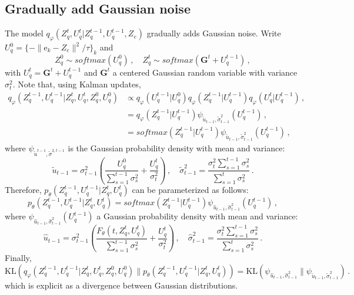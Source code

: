 \documentclass{article}
\newcommand{\rme}{\mathrm{e}}
\begin{document}
\subsection{Gradually add Gaussian noise}
The model $q_{\varphi}(Z_q^t ,U_q^t| Z_q^{t-1},U_q^{t-1}, Z_e)$ gradually adds Gaussian noise. Write $U_q^0 = \{- \| \rme_k - Z_e\|^2/ \tau\}_k $ and 
$$
Z_q^0 \sim softmax(U_q^0 )\,, \quad Z_q^t \sim softmax(\mathbf{G}^t +U_q^{t-1})\,,
$$
with $U_q^t = \mathbf{G}^t +U_q^{t-1}$ and $\mathbf{G}^t$ a centered Gaussian random variable with variance $\sigma_t^2$. 
Note that, using Kalman updates, 
\begin{align*}
q_\varphi(Z_q^{t-1},U_q^{t-1}|Z_q^t,U_q^{t},Z_q^0,U_q^{0}) &\propto q_\varphi(U_q^{t-1}|U_q^{0}) q_\varphi(Z_q^{t-1}|U_q^{t-1})q_\varphi(U_q^{t}|U_q^{t-1})\,,\\
&= q_\varphi(Z_q^{t-1}|U_q^{t-1})\psi_{\tilde u_{t-1},\tilde \sigma_{t-1}^2}(U_q^{t-1})\,,\\
&= softmax(Z_q^{t-1}|U_q^{t-1})\psi_{\tilde u_{t-1},\tilde \sigma_{t-1}^2}(U_q^{t-1})\,,
\end{align*}
where $\psi_{\tilde u^{t-1},\tilde \sigma^{2,t-1}}$ is the Gaussian probability density with mean and variance:
$$
\tilde u_{t-1} = \sigma_{t-1}^2\left(\frac{U_q^{0}}{\sum_{s=1}^{t-1}\sigma_s^2} + \frac{U_q^{t}}{\sigma_t^2}\right)\,,\quad \tilde \sigma_{t-1}^2 = \frac{\sigma_t^2 \sum_{s=1}^{t-1}\sigma_s^2}{\sum_{s=1}^{t}\sigma_s^2}\,.
$$
Therefore, $p_\theta(Z_q^{t-1},U_q^{t-1}|Z_q^t,U_q^t)$ can be parameterized as follows:
$$
p_\theta(Z_q^{t-1},U_q^{t-1}|Z_q^t,U_q^t) = softmax(Z_q^{t-1}|U_q^{t-1})\psi_{\hat u_{t-1},\hat \sigma_{t-1}^2}(U_q^{t-1})\,,
$$
where $\psi_{\hat u_{t-1},\hat \sigma_{t-1}^2}(U_q^{t-1})$ a Gaussian probability density with mean and variance:
$$
\hat u_{t-1} = \sigma_{t-1}^2\left(\frac{F_\theta(t,Z_q^t,U_q^t)}{\sum_{s=1}^{t-1}\sigma_s^2} + \frac{U_q^{t}}{\sigma_t^2}\right)\,,\quad \hat \sigma_{t-1}^2 = \frac{\sigma_t^2 \sum_{s=1}^{t-1}\sigma_s^2}{\sum_{s=1}^{t}\sigma_s^2}\,.
$$
Finally,
$$
\mathrm{KL}(q_\varphi(Z_q^{t-1},U_q^{t-1}|Z_q^t,U_q^{t},Z_q^0,U_q^{0})\|p_\theta(Z_q^{t-1},U_q^{t-1}|Z_q^t,U_q^t)) = \mathrm{KL}(\psi_{\hat u_{t-1},\hat \sigma_{t-1}^2}\|\psi_{\tilde u_{t-1},\tilde \sigma_{t-1}^2})\,.
$$
which is explicit as a divergence between Gaussian distributions.
\end{document}
